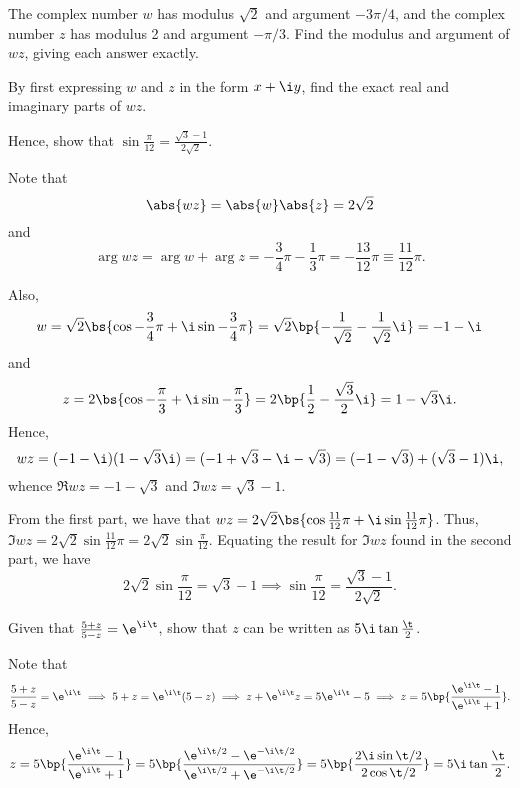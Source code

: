 \begin{problem}
    The complex number $w$ has modulus $\sqrt2$ and argument $-3\pi/4$, and the complex number $z$ has modulus 2 and argument $-\pi/3$. Find the modulus and argument of $wz$, giving each answer exactly.

    By first expressing $w$ and $z$ in the form $x + \i y$, find the exact real and imaginary parts of $wz$.

    Hence, show that $\sin \frac\pi{12} = \frac{\sqrt3 - 1}{2\sqrt2}$.
\end{problem}
\begin{solution}
    Note that \[\abs{wz} = \abs{w} \abs{z} = 2\sqrt2\] and \[\arg{wz} = \arg w + \arg z = - \frac34 \pi - \frac13 \pi = -\frac{13}{12}\pi \equiv \frac{11}{12} \pi.\]

    Also, \[w = \sqrt2 \bs{\cos{-\frac34 \pi} + \i\sin{-\frac34 \pi}} = \sqrt2 \bp{-\frac1{\sqrt2} - \frac1{\sqrt2} \i} = -1-\i\] and \[z = 2\bs{\cos{-\frac\pi3} + \i\sin{-\frac\pi3}} = 2\bp{\frac12 - \frac{\sqrt3}{2} \i} = 1 - \sqrt3 \i.\] Hence, \[wz = (-1 - \i)(1 - \sqrt3 \i) = (-1 + \sqrt3 -\i - \sqrt3) = (-1 - \sqrt3) + (\sqrt3 - 1)\i,\] whence $\Re{wz} = -1 - \sqrt3$ and $\Im{wz} = \sqrt3 - 1$.

    From the first part, we have that $wz = 2\sqrt2 \bs{\cos{\frac{11}{12} \pi} + \i\sin{\frac{11}{12} \pi}}$. Thus, $\Im{wz} = 2\sqrt{2} \sin{\frac{11}{12} \pi} = 2\sqrt2 \sin \frac\pi{12}$. Equating the result for $\Im{wz}$ found in the second part, we have \[2\sqrt2 \sin \frac\pi{12} = \sqrt3 - 1 \implies \sin \frac{\pi}{12} = \frac{\sqrt3 - 1}{2\sqrt2}.\]
\end{solution}

\clearpage
\begin{problem}
    Given that $\frac{5 + z}{5 - z} = \e^{\i\t}$, show that $z$ can be written as $5\i\tan\frac\t2$.
\end{problem}
\begin{solution}
    Note that \[\frac{5 + z}{5 - z} = \e^{\i\t} \implies 5 + z = \e^{\i\t} (5-z) \implies z + \e^{\i\t}z = 5\e^{\i\t} - 5 \implies z = 5 \bp{\frac{\e^{\i\t} - 1}{\e^{\i\t} + 1}}.\] Hence, \[z = 5\bp{\frac{\e^{\i\t} - 1}{\e^{\i\t} + 1}} = 5\bp{\frac{\e^{\i\t/2} - \e^{-\i\t/2}}{\e^{\i\t/2} + \e^{-\i\t/2}}} = 5\bp{\frac{2\i \sin{\t/2}}{2\cos{\t/2}}} = 5\i\tan \frac\t2.\]
\end{solution}

